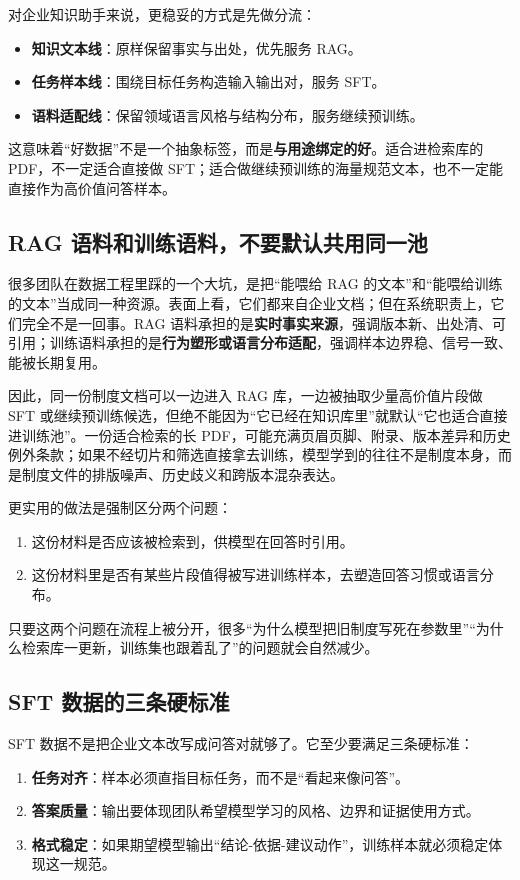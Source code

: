 对企业知识助手来说，更稳妥的方式是先做分流：
\begin{itemize}
  \item \textbf{知识文本线}：原样保留事实与出处，优先服务 RAG。
  \item \textbf{任务样本线}：围绕目标任务构造输入输出对，服务 SFT。
  \item \textbf{语料适配线}：保留领域语言风格与结构分布，服务继续预训练。
\end{itemize}

这意味着“好数据”不是一个抽象标签，而是\textbf{与用途绑定的好}。适合进检索库的 PDF，不一定适合直接做 SFT；适合做继续预训练的海量规范文本，也不一定能直接作为高价值问答样本。

\subsection{RAG 语料和训练语料，不要默认共用同一池}
很多团队在数据工程里踩的一个大坑，是把“能喂给 RAG 的文本”和“能喂给训练的文本”当成同一种资源。表面上看，它们都来自企业文档；但在系统职责上，它们完全不是一回事。RAG 语料承担的是\textbf{实时事实来源}，强调版本新、出处清、可引用；训练语料承担的是\textbf{行为塑形或语言分布适配}，强调样本边界稳、信号一致、能被长期复用。

因此，同一份制度文档可以一边进入 RAG 库，一边被抽取少量高价值片段做 SFT 或继续预训练候选，但绝不能因为“它已经在知识库里”就默认“它也适合直接进训练池”。一份适合检索的长 PDF，可能充满页眉页脚、附录、版本差异和历史例外条款；如果不经切片和筛选直接拿去训练，模型学到的往往不是制度本身，而是制度文件的排版噪声、历史歧义和跨版本混杂表达。

更实用的做法是强制区分两个问题：
\begin{enumerate}
  \item 这份材料是否应该被检索到，供模型在回答时引用。
  \item 这份材料里是否有某些片段值得被写进训练样本，去塑造回答习惯或语言分布。
\end{enumerate}

只要这两个问题在流程上被分开，很多“为什么模型把旧制度写死在参数里”“为什么检索库一更新，训练集也跟着乱了”的问题就会自然减少。

\subsection{SFT 数据的三条硬标准}
SFT 数据不是把企业文本改写成问答对就够了。它至少要满足三条硬标准：
\begin{enumerate}
  \item \textbf{任务对齐}：样本必须直指目标任务，而不是“看起来像问答”。
  \item \textbf{答案质量}：输出要体现团队希望模型学习的风格、边界和证据使用方式。
  \item \textbf{格式稳定}：如果期望模型输出“结论-依据-建议动作”，训练样本就必须稳定体现这一规范。
\end{enumerate}


